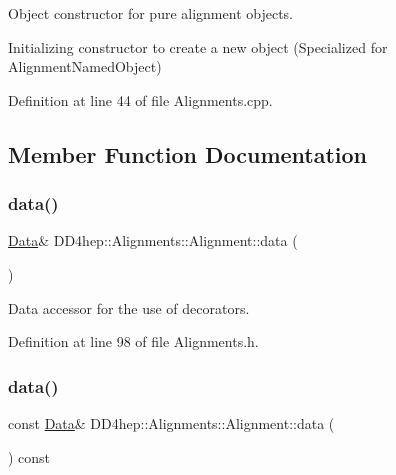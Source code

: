 Object constructor for pure alignment objects. 

Initializing constructor to create a new object (Specialized for Alignment\+Named\+Object) 

Definition at line 44 of file Alignments.\+cpp.



\subsection{Member Function Documentation}
\hypertarget{class_d_d4hep_1_1_alignments_1_1_alignment_a98f34faa8c45525335ebfae7f2506e8c}{}\label{class_d_d4hep_1_1_alignments_1_1_alignment_a98f34faa8c45525335ebfae7f2506e8c} 
\subsubsection{\texorpdfstring{data()}{data()}\hspace{0.1cm}{\footnotesize\ttfamily [1/2]}}
{\footnotesize\ttfamily \hyperlink{class_d_d4hep_1_1_alignments_1_1_alignment_a5ff6a2c0b838274552fbac2f52b9a652}{Data}\& D\+D4hep\+::\+Alignments\+::\+Alignment\+::data (\begin{DoxyParamCaption}{ }\end{DoxyParamCaption})\hspace{0.3cm}{\ttfamily [inline]}}



Data accessor for the use of decorators. 



Definition at line 98 of file Alignments.\+h.

\hypertarget{class_d_d4hep_1_1_alignments_1_1_alignment_a918949c10e5dfb83cb13bc163333f391}{}\label{class_d_d4hep_1_1_alignments_1_1_alignment_a918949c10e5dfb83cb13bc163333f391} 
\subsubsection{\texorpdfstring{data()}{data()}\hspace{0.1cm}{\footnotesize\ttfamily [2/2]}}
{\footnotesize\ttfamily const \hyperlink{class_d_d4hep_1_1_alignments_1_1_alignment_a5ff6a2c0b838274552fbac2f52b9a652}{Data}\& D\+D4hep\+::\+Alignments\+::\+Alignment\+::data (\begin{DoxyParamCaption}{ }\end{DoxyParamCaption}) const\hspace{0.3cm}{\ttfamily [inline]}}



